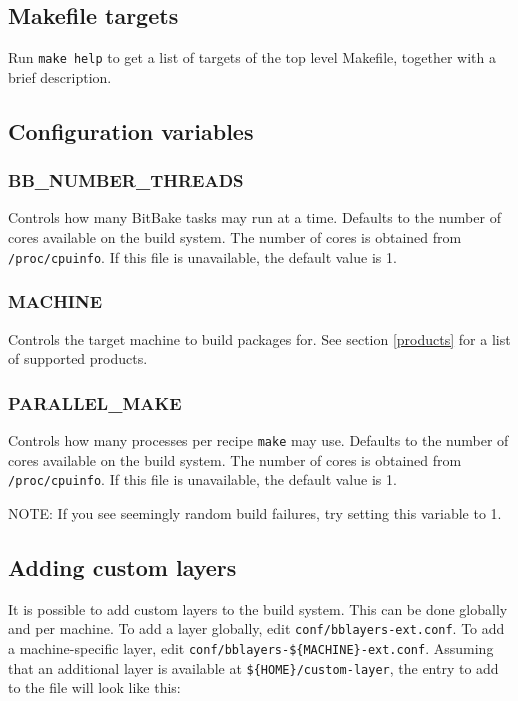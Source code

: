 \documentclass[a4paper]{article}
\newcommand{\shell}[1]{\texttt{\small #1}}
\begin{document}
  \subsection{Makefile targets}
    Run \shell{make help} to get a list of targets of the top level Makefile, together with a brief description.

  \subsection{Configuration variables}
    \subsubsection{BB\_NUMBER\_THREADS}
      Controls how many BitBake tasks may run at a time. Defaults to the
      number of cores available on the build system. The number of cores is
      obtained from \shell{/proc/cpuinfo}. If this file is unavailable, the
      default value is 1.

    \subsubsection{MACHINE}
      Controls the target machine to build packages for. See section \ref{products}
      for a list of supported products.

    \subsubsection{PARALLEL\_MAKE}
      Controls how many processes per recipe \shell{make} may use. Defaults to
      the number of cores available on the build system. The number of cores is
      obtained from \shell{/proc/cpuinfo}. If this file is unavailable, the
      default value is 1.

      NOTE: If you see seemingly random build failures, try setting this variable to 1.

  \subsection{Adding custom layers}
  \label{custom_layers}
     It is possible to add custom layers to the build system. This can be done globally
     and per machine. To add a layer globally, edit \shell{conf/bblayers-ext.conf}. To
     add a machine-specific layer, edit \shell{conf/bblayers-\$\{MACHINE\}-ext.conf}.
     Assuming that an additional layer is available at \shell{\$\{HOME\}/custom-layer},
     the entry to add to the file will look like this:
\end{document}

